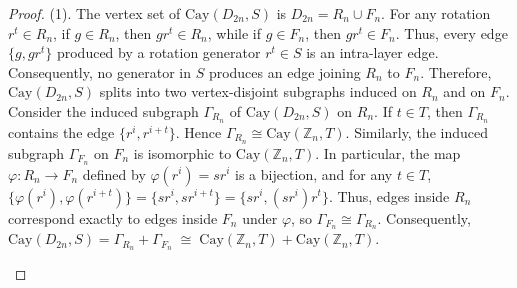 \documentclass[10pt,a4paper]{amsart}
\begin{document}
\begin{proof}
(1). The vertex set of $\mathrm{Cay}(D_{2n}, S)$ is $D_{2n} = R_{n} \cup F_{n}$.  
For any rotation $r^t \in R_{n}$, 
if $g \in R_{n}$, then $g r^t \in R_{n}$, while if $g \in F_{n}$, then $g r^t \in F_{n}$.  
Thus, every edge $\{ g, g r^t \}$ produced by a rotation generator $r^{t}\in S$ is an intra-layer edge.  
Consequently, no generator in $S$ produces an edge joining $R_{n}$ to $F_{n}$.  
Therefore, $\mathrm{Cay}(D_{2n}, S)$ splits into two vertex-disjoint subgraphs induced on $R_{n}$ and on $F_{n}$.
Consider the induced subgraph $\Gamma_{R_{n}}$ of $\mathrm{Cay}(D_{2n}, S)$ on $R_{n}$.  
If $t \in T$, then $\Gamma_{R_{n}}$ contains the edge $\{ r^i, r^{i+t} \}$.  
Hence $\Gamma_{R_{n}}\cong\mathrm{Cay}(\mathbb{Z}_n, T)$.  
Similarly, the induced subgraph $\Gamma_{F_{n}}$ on $F_{n}$ is isomorphic to $\mathrm{Cay}(\mathbb{Z}_n, T)$.  
In particular, the map $\varphi : R_{n} \to F_{n}$ defined by $\varphi(r^i) = s r^i$ is a bijection, and for any $t \in T$,
$\{ \varphi(r^i), \varphi(r^{i+t}) \}
= \{ s r^i, s r^{i+t} \}
= \{ s r^i, (s r^i) r^t \}$.
Thus, edges inside $R_{n}$ correspond exactly to edges inside $F_{n}$ under $\varphi$, so $\Gamma_{F_{n}} \cong \Gamma_{R_{n}}$.  
Consequently,
$\mathrm{Cay}(D_{2n}, S)
= \Gamma_{R_{n}} + \Gamma_{F_{n}} 
\;\cong\;
\mathrm{Cay}(\mathbb{Z}_n, T) + \mathrm{Cay}(\mathbb{Z}_n, T)$.


\begin{figure}[h]
\centering
{}
\end{figure}
\end{proof}
\end{document}
